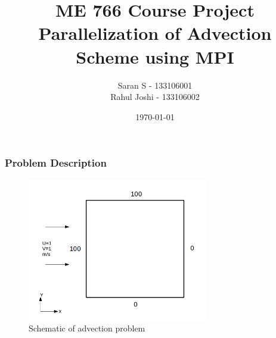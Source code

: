 \documentclass{beamer}
\title[]{{\tiny{ME 766 Course Project}}\\Parallelization of Advection Scheme using MPI} %
\author{Saran S - 133106001 \\ Rahul Joshi - 133106002} %
\institute[Indian Institute of Technology, Bombay] %
{
Indian Institute of Technology, Bombay \\ %
\medskip
\textit{} %
}
\date{\today} %
\begin{document}
\begin{frame}
\titlepage %
\end{frame}

\begin{frame}
\frametitle{Problem Description} %
\begin{figure}
\centering
\includegraphics[width=0.7\textwidth]{1} %
\caption{Schematic of advection problem}
\end{figure}
\end{frame}


\end{document}
